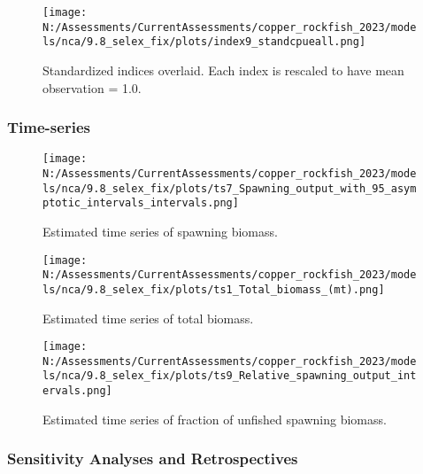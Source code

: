 \documentclass[11pt,
  english,
  letterpaper,
]{article}
\begin{document}
\pagebreak

\begin{figure}
\centering
\texttt{[image: N:/Assessments/CurrentAssessments/copper\_rockfish\_2023/models/nca/9.8\_selex\_fix/plots/index9\_standcpueall.png]}
\caption{Standardized indices overlaid. Each index is rescaled to have mean observation = 1.0.\label{fig:standardized-indices}}
\end{figure}

\pagebreak

\hypertarget{time-series}{%
\subsubsection{Time-series}\label{time-series}}

\begin{figure}
\centering
\texttt{[image: N:/Assessments/CurrentAssessments/copper\_rockfish\_2023/models/nca/9.8\_selex\_fix/plots/ts7\_Spawning\_output\_with\_95\_asymptotic\_intervals\_intervals.png]}
\caption{Estimated time series of spawning biomass.\label{fig:ssb}}
\end{figure}

\pagebreak

\begin{figure}
\centering
\texttt{[image: N:/Assessments/CurrentAssessments/copper\_rockfish\_2023/models/nca/9.8\_selex\_fix/plots/ts1\_Total\_biomass\_(mt).png]}
\caption{Estimated time series of total biomass.\label{fig:tot-bio}}
\end{figure}

\pagebreak

\begin{figure}
\centering
\texttt{[image: N:/Assessments/CurrentAssessments/copper\_rockfish\_2023/models/nca/9.8\_selex\_fix/plots/ts9\_Relative\_spawning\_output\_intervals.png]}
\caption{Estimated time series of fraction of unfished spawning biomass.\label{fig:depl}}
\end{figure}

\pagebreak

\hypertarget{sensitivity-analyses-and-retrospectives}{%
\subsubsection{Sensitivity Analyses and Retrospectives}\label{sensitivity-analyses-and-retrospectives}}
\end{document}
